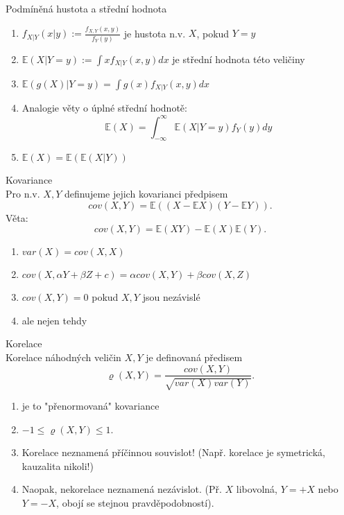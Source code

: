 \documentclass[../main.tex]{subfiles}
\begin{document}
\begin{definition}
    Podmíněná hustota a střední hodnota
    \begin{enumerate}
        \item $f_{X|Y}(x|y) := \frac{f_{X,Y}(x,y)}{f_Y(y)}$ je hustota n.v. $X$, pokud $Y = y$
        \item $\mathbb{E}(X|Y=y):=\int xf_{X|Y}(x,y)dx$ je střední hodnota této veličiny
        \item $\mathbb{E}(g(X)|Y=y) = \int g(x)f_{X|Y}(x,y)dx$
        \item Analogie věty o úplné střední hodnotě:
        \[\mathbb{E}(X) = \int^\infty_{-\infty}\mathbb{E}(X|Y=y)f_Y(y)dy\]
        \item $\mathbb{E}(X) = \mathbb{E}(\mathbb{E}(X|Y))$
    \end{enumerate}
\end{definition}
\begin{definition}
    Kovariance\\

    Pro n.v. $X,Y$ definujeme jejich kovarianci předpisem
    \[cov(X,Y) = \mathbb{E}((X-\mathbb{E}X)(Y-\mathbb{E}Y)).\]
    Věta:
    \[cov(X,Y) = \mathbb{E}(XY) - \mathbb{E}(X)\mathbb{E}(Y).\]
    \begin{enumerate}
        \item $var(X) = cov(X,X)$
        \item $cov(X,\alpha Y + \beta Z + c) = \alpha cov(X,Y) + \beta cov(X,Z)$
        \item $cov(X,Y) = 0$ pokud $X,Y$ jsou nezávislé
        \item ale nejen tehdy
    \end{enumerate}
\end{definition}
\begin{definition}
    Korelace\\

    Korelace náhodných veličin $X,Y$ je definovaná předisem
    \[\varrho (X,Y) = \frac{cov(X,Y)}{\sqrt{var(X)var(Y)}}.\]
    \begin{enumerate}
        \item je to "přenormovaná" kovariance
        \item $-1 \leq \varrho(X,Y) \leq 1$.
        \item Korelace neznamená příčinnou souvislot! (Např. korelace je symetrická, kauzalita nikoli!)
        \item Naopak, nekorelace neznamená nezávislot. (Př. $X$ libovolná, $Y = +X$ nebo $Y = -X$, obojí se stejnou pravděpodobností).    \end{enumerate}
\end{definition}
\end{document}
